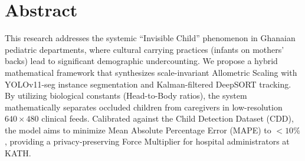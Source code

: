 \chapter*{Abstract}
This research addresses the systemic ``Invisible Child'' phenomenon in Ghanaian pediatric departments, where cultural carrying practices (infants on mothers' backs) lead to significant demographic undercounting. We propose a hybrid mathematical framework that synthesizes scale-invariant Allometric Scaling with YOLOv11-seg instance segmentation and Kalman-filtered DeepSORT tracking. By utilizing biological constants (Head-to-Body ratios), the system mathematically separates occluded children from caregivers in low-resolution $640 \times 480$ clinical feeds. Calibrated against the Child Detection Dataset (CDD), the model aims to minimize Mean Absolute Percentage Error (MAPE) to $<10\%$, providing a privacy-preserving Force Multiplier for hospital administrators at KATH.

